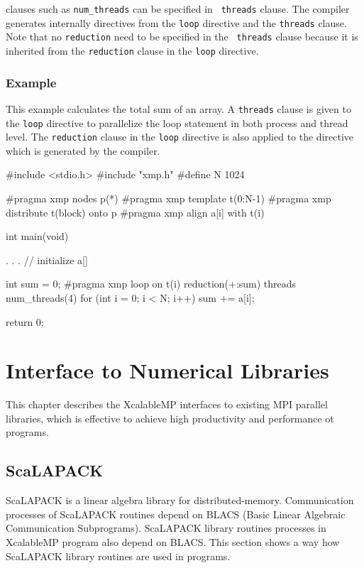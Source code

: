    {\OMP} clauses such as {\tt num\_threads} can be specified in {\tt
   threads} clause.
   The {\XMP} compiler generates internally {\OMP} directives from the
   {\tt loop} directive and the {\tt threads} clause.
   Note that no {\tt reduction} need to be specified in the {\tt
   threads} clause because it is inherited from the {\tt reduction}
   clause in the {\tt loop} directive.

\subsection*{Example}

   This example calculates the total sum of an array.
   A {\tt threads} clause is given to the {\tt loop} directive to
   parallelize the loop statement in both process and
   thread level. 
   The {\tt reduction} clause in the {\tt loop} directive is also
   applied to the {\OMP} directive which is generated by the {\XMP}
   compiler.

\begin{XCexample}
#include <stdio.h>
#include "xmp.h"
#define N 1024

#pragma xmp nodes p(*)
#pragma xmp template t(0:N-1)
#pragma xmp distribute t(block) onto p
#pragma xmp align a[i] with t(i)

int main(void) {
  . . . // initialize a[]

  int sum = 0;
#pragma xmp loop on t(i) reduction(+:sum) threads num_threads(4)
  for (int i = 0; i < N; i++) {
    sum += a[i];
  }

  return 0;
}
\end{XCexample}


\chapter{Interface to Numerical Libraries}

   This chapter describes the XcalableMP interfaces to existing MPI
   parallel libraries, which is effective to achieve high productivity
   and performance ot {\XMP} programs.
   
\section{ScaLAPACK}

   ScaLAPACK is a linear algebra library for distributed-memory.
   Communication processes of ScaLAPACK routines depend on BLACS
   (Basic Linear Algebraic Communication Subprograms).
   ScaLAPACK library routines processes in XcalableMP program also depend on 
   BLACS. This section shows a way how ScaLAPACK library routines are used in
   {\XMP} programs.

